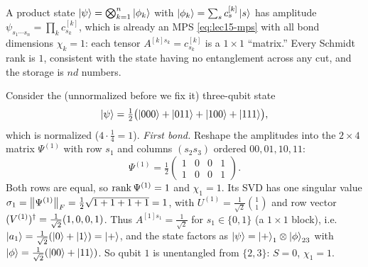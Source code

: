 \begin{example}[MPS of a product state has $\chi=1$]\label{exa:lec15-product}
A product state $\ket{\psi}=\bigotimes_{k=1}^{n}\ket{\phi_k}$ with
$\ket{\phi_k}=\sum_{s}c^{[k]}_{s}\ket{s}$ has amplitude
$\psi_{s_1\cdots s_n}=\prod_k c^{[k]}_{s_k}$, which is already an MPS
\eqref{eq:lec15-mps} with all bond dimensions $\chi_k=1$: each tensor
$A^{[k]s_k}=c^{[k]}_{s_k}$ is a $1\times1$ ``matrix.'' Every Schmidt rank is $1$,
consistent with the state having no entanglement across any cut, and the storage
is $nd$ numbers.
\end{example}

\begin{example}\label{exa:lec15-threequbit}
Consider the (unnormalized before we fix it) three-qubit state
\[
  \ket{\psi}=\tfrac12\bigl(\ket{000}+\ket{011}+\ket{100}+\ket{111}\bigr),
\]
which is normalized ($4\cdot\tfrac14=1$). \emph{First bond.} Reshape the
amplitudes into the $2\times4$ matrix $\Psi^{(1)}$ with row $s_1$ and columns
$(s_2 s_3)$ ordered $00,01,10,11$:
\[
  \Psi^{(1)}=\tfrac12\begin{pmatrix}1&0&0&1\\ 1&0&0&1\end{pmatrix}.
\]
Both rows are equal, so $\operatorname{rank}\Psi^{(1)}=1$ and $\chi_1=1$. Its SVD has one
singular value $\sigma_1=\left\lVert \Psi^{(1)} \right\rVert_F=\tfrac12\sqrt{1+1+1+1}=1$, with
$U^{(1)}=\tfrac1{\sqrt2}\binom{1}{1}$ and row vector
$(V^{(1)})^{\dagger}=\tfrac1{\sqrt2}(1,0,0,1)$. Thus $A^{[1]s_1}=\tfrac1{\sqrt2}$ for
$s_1\in\{0,1\}$ (a $1\times1$ block), i.e. $\ket{a_1}=\tfrac1{\sqrt2}(\ket0+\ket1)=\ket{+}$,
and the state factors as $\ket{\psi}=\ket{+}_1\otimes\ket{\phi}_{23}$ with
$\ket{\phi}=\tfrac1{\sqrt2}(\ket{00}+\ket{11})$. So qubit $1$ is unentangled from
$\{2,3\}$: $S=0$, $\chi_1=1$.


\end{example}
